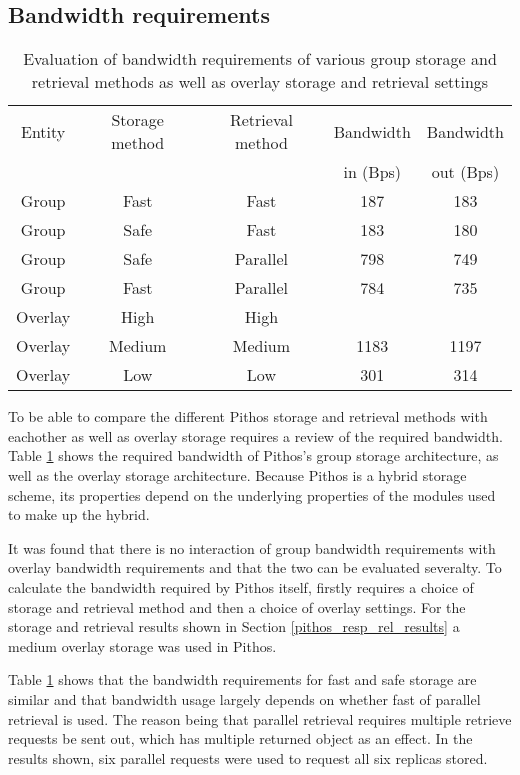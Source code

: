 \subsection{Bandwidth requirements}
\label{bandwidth_requirements}

\begin{table}[htbp]
\centering
\begin{tabular}{|c|c|c|c|c|}
\hline
Entity & Storage method & Retrieval method & Bandwidth & Bandwidth\\
       &                &                  & in (Bps)  & out (Bps)\\
\hline
Group   &   Fast    &   Fast      &   187  &  183  \\
Group   &   Safe    &   Fast      &   183  &  180  \\
Group   &   Safe    &   Parallel  &   798  &  749  \\
Group   &   Fast    &   Parallel  &   784  &  735  \\
\hline
Overlay &   High    &   High      &        &       \\
Overlay &   Medium  &   Medium    &  1183  &  1197 \\
Overlay &   Low     &   Low       &  301   &  314  \\
\hline
\end{tabular}
\caption{Evaluation of bandwidth requirements of various group storage and retrieval methods as well as overlay storage and retrieval settings}
\label{tab_bandwidth_results}
\end{table}

To be able to compare the different Pithos storage and retrieval methods with eachother as well as overlay storage requires a review of the required bandwidth. Table \ref{tab_bandwidth_results} shows the required bandwidth of Pithos's group storage architecture, as well as the overlay storage architecture. Because Pithos is a hybrid storage scheme, its properties depend on the underlying properties of the modules used to make up the hybrid.

It was found that there is no interaction of group bandwidth requirements with overlay bandwidth requirements and that the two can be evaluated severalty. To calculate the bandwidth required by Pithos itself, firstly requires a choice of storage and retrieval method and then a choice of overlay settings. For the storage and retrieval results shown in Section \ref{pithos_resp_rel_results} a medium overlay storage was used in Pithos.

Table \ref{tab_bandwidth_results} shows that the bandwidth requirements for fast and safe storage are similar and that bandwidth usage largely depends on whether fast of parallel retrieval is used. The reason being that parallel retrieval requires multiple retrieve requests be sent out, which has multiple returned object as an effect. In the results shown, six parallel requests were used to request all six replicas stored.

